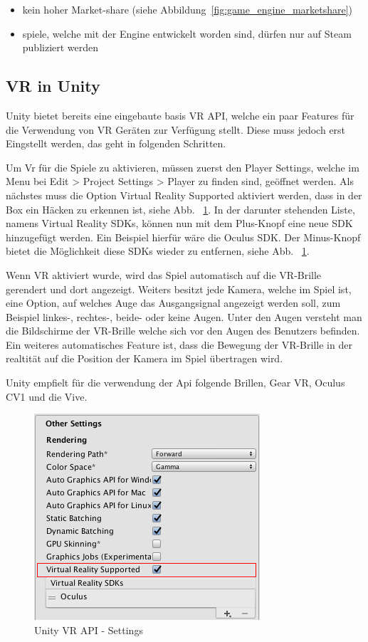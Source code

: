 \begin{itemize}
    \item kein hoher Market-share (siehe Abbildung~\ref{fig:game_engine_marketshare})
    \item spiele, welche mit der Engine entwickelt worden sind, dürfen nur auf Steam publiziert werden~\cite{Brenna_Hillier_2015}
\end{itemize}


\subsection{VR in Unity}
Unity bietet bereits eine eingebaute basis VR API, welche ein paar Features für die Verwendung von VR Geräten zur Verfügung stellt.
Diese muss jedoch erst Eingstellt werden, das geht in folgenden Schritten.

Um Vr für die Spiele zu aktivieren, müssen zuerst den Player Settings, welche im Menu bei Edit > Project Settings > Player zu finden sind, geöffnet werden.
Als nächstes muss die Option Virtual Reality Supported aktiviert werden, dass in der Box ein Häcken zu erkennen ist, siehe Abb. ~\ref{fig:unity_vr_api_settings}.
In der darunter stehenden Liste, namens Virtual Reality SDKs, können nun mit dem Plus-Knopf eine neue SDK hinzugefügt werden.
Ein Beispiel hierfür wäre die Oculus SDK.
Der Minus-Knopf bietet die Möglichkeit diese SDKs wieder zu entfernen, siehe Abb. ~\ref{fig:unity_vr_api_settings}.
~\cite{Unity_VR_Overview_2022}

Wenn VR aktiviert wurde, wird das Spiel automatisch auf die VR-Brille gerendert und dort angezeigt.
Weiters besitzt jede Kamera, welche im Spiel ist, eine Option, auf welches Auge das Ausgangsignal angezeigt werden soll, zum Beispiel linkes-, rechtes-, beide- oder keine Augen.
Unter den Augen versteht man die Bildschirme der VR-Brille welche sich vor den Augen des Benutzers befinden.
Ein weiteres automatisches Feature ist, dass die Bewegung der VR-Brille in der realtität auf die Position der Kamera im Spiel übertragen wird.

Unity empfielt für die verwendung der Api folgende Brillen, Gear VR, Oculus CV1 und die Vive.
~\cite{Unity_VR_Overview_2022}

\begin {figure}
    \centering
    \includegraphics[scale=0.8]{pics/unity_basis_vr_api_settings}
    \caption{Unity VR API - Settings}
    \label{fig:unity_vr_api_settings}
\end {figure}

